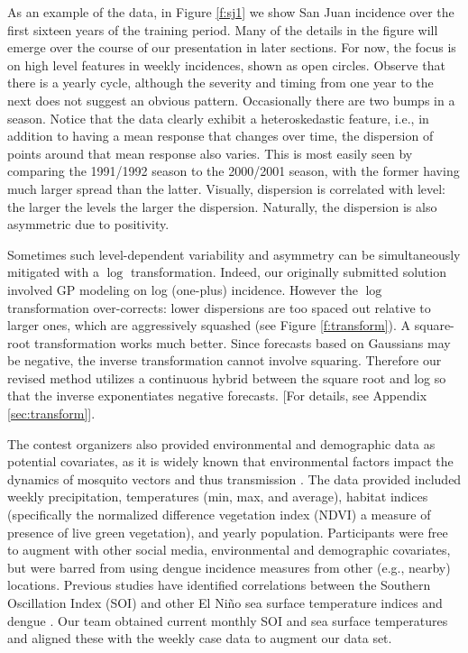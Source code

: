 \documentclass[12pt]{article}
\begin{document}
As an example of the data, in Figure \ref{f:sj1} we show San Juan incidence
over the first sixteen years of the training period.  Many of the details in
the figure  will emerge over the course of our presentation in later sections.
For now, the focus is on high level features in weekly incidences, shown as open
circles. Observe that there is a yearly cycle, although the severity and
timing from one year to the next does not suggest an obvious pattern.
Occasionally there are two bumps in a season. Notice that the data clearly
exhibit a heteroskedastic feature, i.e., in addition to having a mean response
that changes over time, the dispersion of points around that mean response
also varies.  This is most easily seen by comparing the 1991/1992 season to
the 2000/2001 season, with the former having much larger spread than the
latter. Visually, dispersion is correlated with level: the larger the levels
the larger the dispersion. Naturally, the dispersion is also asymmetric due to
positivity.

Sometimes such level-dependent variability and asymmetry can be simultaneously
mitigated with a $\log$ transformation. Indeed, our originally submitted
solution involved GP modeling on log (one-plus) incidence. However the $\log$
transformation over-corrects: lower dispersions are too spaced out relative to
larger ones, which are aggressively squashed (see Figure \ref{f:transform}). A
square-root transformation works much better.  Since forecasts based on
Gaussians may be negative, the inverse transformation cannot involve squaring.
Therefore our revised method utilizes a continuous hybrid between the square
root and log so that the inverse exponentiates negative forecasts. [For
details, see Appendix \ref{sec:transform}].

The contest organizers also provided environmental and demographic data as
potential covariates, as it is widely known that environmental factors impact
the dynamics of mosquito vectors and thus transmission \citep[e.g., ]
[]{moore:etal:1978,johansson:etal:2009,barrera:etal:2011,lambrechts:etal:2011,
stewart:etal:2013,xu:etal:2016}.  The data provided included weekly
precipitation, temperatures (min, max, and average), habitat indices
(specifically the normalized difference vegetation index (NDVI) a measure of
presence of live green vegetation), and yearly population. Participants were
free to augment with other social media, environmental and demographic
covariates, but were barred from using dengue incidence measures from other
(e.g., nearby) locations. Previous studies have identified correlations
between the  Southern Oscillation Index (SOI) and other El Ni\~no sea surface
temperature indices and dengue \citep[e.g.,
][]{gagnon:etal:2001,johansson:etal:2009}. Our team obtained current monthly
SOI and sea surface temperatures \citep{reynolds:etal:2002} and aligned these
with the weekly case data to augment our data set.
\end{document}
